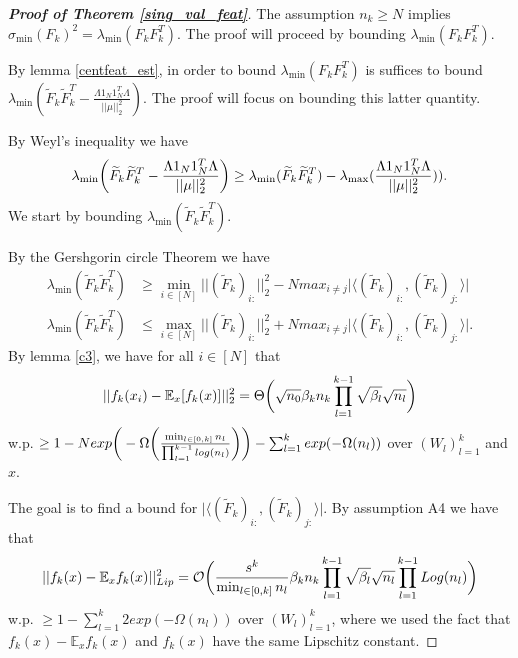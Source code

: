 \documentclass{article}
\theoremstyle{plain}
\theoremstyle{definition}
\theoremstyle{remark}
\begin{document}
\begin{proof}[\textbf{Proof of Theorem \ref{sing_val_feat}}]

The assumption $n_k \geq N$ implies 
$\sigma_{\min}(F_k)^2 = \lambda_{\min}(F_kF_k^T)$. The proof will proceed by bounding 
$\lambda_{\min}(F_kF_k^T)$.

By lemma \ref{centfeat_est}, in order to bound 
$\lambda_{\min}(F_kF_k^T)$ is suffices to bound 
$\lambda_{\min}(\widetilde{F}_k\widetilde{F}_k^T - 
\frac{\Lambda 1_N1_N^T\Lambda}{\vert\vert\mu\vert\vert^2_2})$. The proof will focus on bounding this latter quantity. 

By Weyl's inequality we have
\begin{equation}\label{weyl_est}
	\lambda_{\min}\bigg{(}\widetilde{F}_k\widetilde{F}_k^T - 
\frac{\Lambda 1_N1_N^T\Lambda}{\vert\vert\mu\vert\vert^2_2}\bigg{)} 
\geq 
\lambda_{\min}(\widetilde{F}_k\widetilde{F}_k^T) - 
\lambda_{\max}(\frac{\Lambda 1_N1_N^T\Lambda}{\vert\vert\mu\vert\vert^2_2})).
\end{equation}
We start by bounding $\lambda_{\min}(\widetilde{F}_k\widetilde{F}_k^T)$. 

By the Gershgorin circle Theorem we have
\begin{align}
\lambda_{\min}(\widetilde{F}_k\widetilde{F}_k^T) &\geq 
\min_{i \in [N]}\vert\vert (\widetilde{F}_k)_{i:}\vert\vert^2_2 - N
max_{i\neq j}\vert\langle (\widetilde{F}_k)_{i:}, (\widetilde{F}_k)_{j:}
\rangle\vert \label{gersh1} \\
\lambda_{\min}(\widetilde{F}_k\widetilde{F}_k^T) &\leq 
\max_{i \in [N]}\vert\vert (\widetilde{F}_k)_{i:}\vert\vert^2_2 + N
max_{i\neq j}\vert\langle (\widetilde{F}_k)_{i:}, (\widetilde{F}_k)_{j:}
\rangle\vert. \label{gersh2}
\end{align}
By lemma \ref{c3}, we have for all $i \in [N]$ that
\begin{equation}
\vert\vert f_k(x_i) - \mathbb{E}_x[f_k(x)]\vert\vert_2^2 = 
\Theta\bigg{(} 
\sqrt{n_0}\beta_kn_k\prod_{l=1}^{k-1}\sqrt{\beta_l}\sqrt{n_l}
\bigg{)}\label{gersh_est1}
\end{equation}
w.p. $\geq 
1 - Nexp\bigg{(}-\Omega \bigg{(} 
\frac{\min_{l\in [0,k]}n_l}{\prod_{l=1}^{k-1}log(n_l)}
\bigg{)}
\bigg{)}
- \sum_{l=1}^kexp(-\Omega(n_l))$ over $(W_l)_{l=1}^k$ and $x$.


The goal is to find a bound for 
$\vert\langle (\widetilde{F}_k)_{i:}, (\widetilde{F}_k)_{j:}
\rangle\vert$. By assumption A4 we have that
\begin{equation*}
	\vert\vert f_k(x) - \mathbb{E}_xf_k(x)\vert\vert^2_{Lip} = 
	\mathcal{O}\bigg{(}
	\frac{s^k}{\min_{l \in [0,k]}n_l}\beta_kn_k\prod_{l=1}^{k-1}
	\sqrt{\beta_l}\sqrt{n_l}\prod_{l=1}^{k-1}Log(n_l)
	\bigg{)}
\end{equation*}
w.p. $\geq 1 - \sum_{l=1}^k2exp(-\Omega(n_l))$ over $(W_l)_{l=1}^k$,
where we used the fact that $f_k(x) - \mathbb{E}_xf_k(x)$ and $f_k(x)$ have the same Lipschitz constant.


\end{proof}
\end{document}
